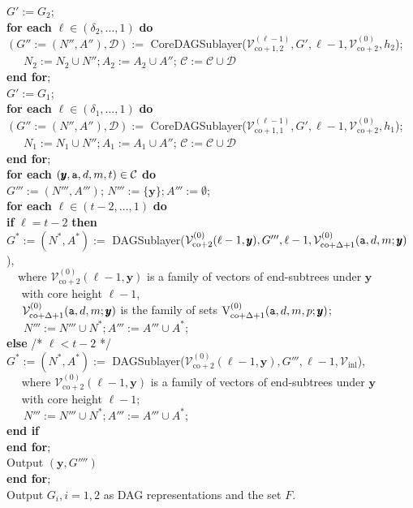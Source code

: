\documentclass[12pt]{article}
\newcommand{\co}{\mathrm{co}}
\newcommand{\V}{{\rm V}}
\newcommand{\ta}{{\tt a}}
\newcommand{\y}{\pmb{y}}
\newcommand{\1}{\pmb{1}}
\newcommand{\0}{\pmb{0}}
\newcommand{\inl}{\mathrm{inl}}
\newcommand{\Vv}{\mathcal{V}}
\begin{document}
\begin{tabbing}
	$G' := G_2$;\\
	{\bf for each} $\ell \in (\delta_2, \ldots, 1)$ {\bf do}\+ \\ %
		$(G'':=(N'', A''), \mathcal{D}) :=$ 
		CoreDAGSublayer($\Vv_{\co+1, 2}^{(\ell-1)}, G',
		 \ell-1, \Vv_{\co+2}^{(0)}, h_2$);\\
		~~~$N_2:= N_2 \cup N''; A_2:= A_2 \cup A''$; 
		$\mathcal{C}:= \mathcal{C} \cup \mathcal{D}$\- \\		
	{\bf end for};\\
	$G' := G_1$;\\
	{\bf for each} $\ell \in (\delta_1, \ldots, 1)$ {\bf do}\+ \\ %
		$(G'':=(N'', A''), \mathcal{D}) :=$ 
		CoreDAGSublayer($\Vv_{\co+1, 1}^{(\ell-1)}, G',
		 \ell-1, \Vv_{\co+2}^{(0)}, h_1$);\\
		~~~$N_1:= N_1 \cup N''; A_1:= A_1 \cup A''$; 
		$\mathcal{C}:= \mathcal{C} \cup \mathcal{D}$\- \\		
	{\bf end for};\\
	{\bf for each} $(\y, \ta, d, m, t ) \in \mathcal{C}$ {\bf do}\+ \\
	$G''' := (N''', A''')$; $N''':= \{\y\}; A''':= \emptyset$;\\
	{\bf for each} $\ell \in (t-2, \ldots, 1)$ {\bf do}\+ \\ %
	{\bf if} $\ell = t-2$ {\bf then} \+ \\
		$G^*:=(N^*, A^*) :=$ 
		DAGSublayer($\Vv_{\co + 2}^{(0)}(\ell - 1, \y), G''',
		 \ell-1,\Vv_{\co+\Delta + 1}^{(0)}(\ta, d, m; \y)$),\\
		 ~~where $\Vv_{\co + 2}^{(0)}(\ell - 1, \y)$ 
		 is a family of 
		 vectors of end-subtrees under $\y$\\
		 ~~  with core height 
		 $\ell - 1$, 	\\	 
		~~ $\Vv_{\co+\Delta + 1}^{(0)}(\ta, d, m; \y)$ is the 
		 family of sets $\V_{\co+\Delta + 1}^{(0)}(\ta, d, m, p; \y)$;\\
		~~~$N''':= N''' \cup N^*; A''':= A''' \cup A^*$;	\- \\	
		{\bf else} /* $\ell < t-2 $ */ \+\\
			$G^*:=(N^*, A^*) :=$ 
			DAGSublayer($\Vv_{\co + 2}^{(0)}(\ell - 1, \y), G''',
		 \ell-1,\Vv_{\inl}$),\\
		 ~~ where $\Vv_{\co + 2}^{(0)}(\ell - 1, \y)$ 
		 is a family of 
		 vectors of end-subtrees under $\y$ \\
		 ~~ with core height $\ell - 1$;\\
		~~~$N''':= N''' \cup N^*; A''':= A''' \cup A^*$;	\- \\	
		{\bf end if}\-\\
	{\bf end for}; \\
	Output $(\y, G'''')$\- \\
	{\bf end for};\\
Output $G_i, i= 1, 2$ as DAG representations and 
the set $F$.
\end{tabbing}
\end{document}
